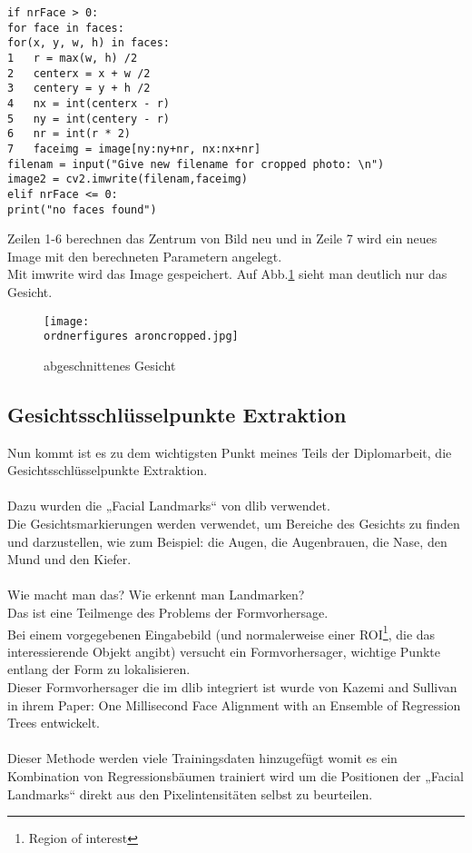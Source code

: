 \begin{lstlisting}
if nrFace > 0:
for face in faces:
for(x, y, w, h) in faces:
1	r = max(w, h) /2 
2	centerx = x + w /2 
3	centery = y + h /2
4	nx = int(centerx - r) 
5	ny = int(centery - r) 
6	nr = int(r * 2) 
7	faceimg = image[ny:ny+nr, nx:nx+nr] 
filenam = input("Give new filename for cropped photo: \n")
image2 = cv2.imwrite(filenam,faceimg)
elif nrFace <= 0:
print("no faces found")

\end{lstlisting}

Zeilen 1-6 berechnen das Zentrum von Bild neu und in Zeile 7 wird ein neues Image mit den berechneten Parametern angelegt.\\
Mit imwrite wird das Image gespeichert. Auf Abb.\ref{fig:aroncropped} sieht man deutlich nur das Gesicht. \\

\begin{figure}[H]
\texttt{[image: \\ordnerfigures aroncropped.jpg]}
\centering
\caption{abgeschnittenes Gesicht}
\label{fig:aroncropped}
\end{figure}

\subsection{Gesichtsschlüsselpunkte Extraktion}


Nun kommt ist es zu dem wichtigsten Punkt meines Teils der Diplomarbeit, die Gesichtsschlüsselpunkte Extraktion. \\\\
Dazu wurden die „Facial Landmarks“ von dlib verwendet. \\
Die Gesichtsmarkierungen werden verwendet, um Bereiche des Gesichts zu finden und darzustellen, wie zum Beispiel: die Augen, die Augenbrauen, die Nase, den Mund und den Kiefer. \\\\
Wie macht man das? Wie erkennt man Landmarken? \\Das ist eine Teilmenge des Problems der Formvorhersage.\\ Bei einem vorgegebenen Eingabebild (und normalerweise einer ROI\footnote{Region of interest}, die das interessierende Objekt angibt) versucht ein Formvorhersager, wichtige Punkte entlang der Form zu lokalisieren. \\
Dieser Formvorhersager die im dlib integriert ist wurde von Kazemi and Sullivan in ihrem Paper: One Millisecond Face Alignment with an Ensemble of Regression Trees entwickelt.\cite{Kazemi2014OneMF} \\\\
Dieser Methode werden viele Trainingsdaten hinzugefügt womit es ein Kombination von Regressionsbäumen trainiert wird um die Positionen der „Facial Landmarks“ direkt aus den Pixelintensitäten selbst zu beurteilen.\cite{Kazemi2014OneMF} \\


